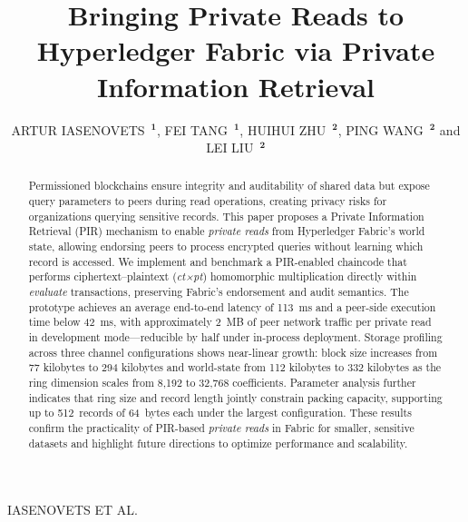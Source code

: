\documentclass{ieeetj}
\def\authorrefmark#1{\ensuremath{^{\textbf{#1}}}}
\begin{document}

{IASENOVETS ET AL.}

\title{Bringing Private Reads to Hyperledger Fabric via Private Information Retrieval}

\author{ARTUR IASENOVETS~\authorrefmark{1},
FEI TANG~\authorrefmark{1},
HUIHUI ZHU~\authorrefmark{2},
PING WANG~\authorrefmark{2} and
LEI LIU~\authorrefmark{2}}

\begin{abstract}
    Permissioned blockchains ensure integrity and auditability of shared data but expose 
    query parameters to peers during read operations, creating privacy risks for organizations querying sensitive records. 
    This paper proposes a Private Information Retrieval (PIR) mechanism to enable \emph{private reads} from Hyperledger Fabric’s 
    world state, allowing endorsing peers to process encrypted queries without learning which record is accessed. We implement and benchmark a PIR-enabled 
    chaincode that performs ciphertext–plaintext (\emph{ct×pt}) homomorphic multiplication directly within \emph{evaluate} 
    transactions, preserving Fabric’s endorsement and audit semantics. The prototype achieves an average end-to-end latency 
    of 113~ms and a peer-side execution time below 42~ms, with approximately 2~MB of peer network traffic per private read in 
    development mode—reducible by half under in-process deployment. Storage profiling across three channel configurations shows 
    near-linear growth: block size increases from 77 kilobytes to 294 kilobytes and world-state from 112 kilobytes to 
    332 kilobytes as the ring dimension scales from 8,192 to 32,768 coefficients. Parameter analysis further indicates that 
    ring size and record length jointly constrain packing capacity, supporting up to 512~records of 64~bytes each 
    under the largest configuration. These results confirm the practicality of PIR-based \emph{private reads} in Fabric 
    for smaller, sensitive datasets and highlight future directions to optimize performance and scalability.
  \end{abstract}
    
\end{document}
